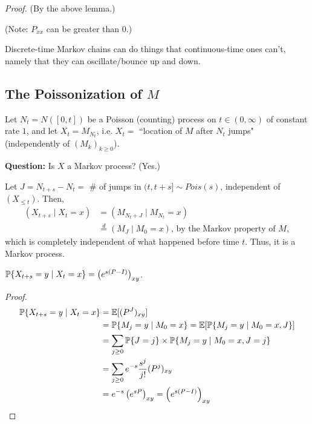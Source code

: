 \documentclass[12pt]{article}
\begin{document}
\noindent\textit{Proof.} (By the above lemma.)

\noindent(Note: $P_{xx}$ can be greater than $0$.)

Discrete-time Markov chains can do things that continuous-time ones can't, namely that they can oscillate/bounce up and down.

\subsection*{The Poissonization of $M$}
\begin{exmp}[]

Let $N_t = N([0,t])$ be a Poisson (counting) process on $t\in(0,\infty)$ of constant rate $1$, and let $X_t=M_{N_t}$, i.e. $X_t=$ ``location of $M$ after $N_t$ jumps" (independently of $(M_k)_{k\geq 0}$).

\noindent\textbf{Question:} Is $X$ a Markov process? (Yes.)

\begin{sol} Let $J = N_{t+s} - N_t = $ \# of jumps in $(t, t+s] \sim Pois(s)$, independent of $(X_{\leq t})$. Then,
$$\begin{aligned}
	(X_{t+s} \mid X_t = x) &= (M_{N_t + J} \mid M_{N_t} = x)\\
	&\stackrel{d}{=} (M_J \mid M_0 = x) \text{, by the Markov property of } M,
\end{aligned}$$
which is completely independent of what happened before time $t$. Thus, it is a Markov process.
\end{sol}
\end{exmp}

\begin{coro} $\P\{X_{t+s}=y \mid X_t = x \} = \left( e^{s(P-I)} \right)_{xy}$.
\end{coro}

\begin{proof} 
$$\begin{aligned}
\P\{X_{t+s}=y \mid X_t = x \} &= \E[(P^J)_{xy}] \\
	&= \P\{M_j=y \mid M_0=x \} = \E[\P\{M_j=y \mid M_0=x, J \}] \\
	&= \sum_{j\geq0} \P\{J=j\} \times \P\{M_j=y \mid M_0=x, J=j\} \\
	&= \sum_{j\geq0} e^{-s} \frac{s^j}{j!} (P^j)_{xy} \\
	&= e^{-s}\left(e^{sP} \right)_{xy} = \left( e^{s(P-I)} \right)_{xy}
\end{aligned}$$
\end{proof}
\end{document}
